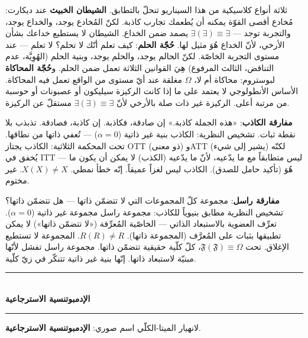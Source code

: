 \documentclass[10pt, openany, oneside]{book}
\renewcommand{\normalsize}{\fontsize{10}{13}\selectfont}
\begin{document}
ثلاثة أنواع كلاسيكية من هذا السيناريو تنحلّ بالتطابق. \textbf{الشيطان الخبيث} عند ديكارت: مُخادع أقصى القوّة يمكنه أن يُطعمك تجارب كاذبة. لكنّ المُخادع يوجد، والخداع يوجد، والتجربة توجد --- $\exists(\exists) \equiv \exists$ يصمد ضمن الخداع. الشيطان لا يستطيع خداعك بشأن الأرخي، لأنّ الخداع هُوَ مثيل لها. \textbf{حُجّة الحلم}: كيف تعلم أنّك لا تحلم؟ لا تعلم --- عند مستوى التجربة الخاصّة. لكنّ الحالم يوجد، والحلم يوجد، وبنية الحلم (الهُوِيَّة، عدم التناقض، الثالث المرفوع) هِيَ القوانين الثلاثة تعمل ضمن الحلم. و\textbf{حُجّة المحاكاة} لبوستروم: محاكاة أم لا، $\Omega$ مغلقة عند أيّ مستوى من الواقع تعمل فيه المحاكاة. الأساس الأنطولوجي لا يعتمد على ما إذا كانت الركيزة سيليكون أو عصبونات أو حوسبة من مرتبة أعلى. الركيزة غير ذات صلة بالأرخي لأنّ $\exists(\exists) \equiv \exists$ مستقلّ عن الركيزة.

\textbf{مفارقة الكاذب}: «هذه الجملة كاذبة.» إن صادقة، فكاذبة. إن كاذبة، فصادقة. تذبذب بلا نقطة ثبات. تشخيص النظرية: الكاذب بنية غير ذاتية ($\alpha = 0$) --- تُعفي ذاتها من نطاقها. تحت المحكمة الثلاثية: الكاذب يجتاز OTT (ذو معنى) وATT (يشير إلى شيء) لكنّه يُخفق في ITT --- ليس متطابقاً مع ما يدّعيه، لأنّ ما يدّعيه (الكذب) لا يمكن أن يكون ما هُوَ (تأكيد حامل للصدق). الكاذب ليس لغزاً عميقاً. إنّه خطأ نمطي. $X(X) \neq X$. غير مختوم.

\textbf{مفارقة راسل}: مجموعة كلّ المجموعات التي لا تتضمّن ذاتها --- هل تتضمّن ذاتها؟ تشخيص النظرية مطابق بنيوياً للكاذب: مجموعة راسل مجموعة غير ذاتية ($\alpha = 0$). تعرِّف العضوية بالاستبعاد الذاتي --- الخاصّية المُعرِّفة («لا تتضمّن ذاتها») لا يمكن تطبيقها بثبات على المُعرَّف (المجموعة ذاتها). $R(R) \neq R$. المجموعة لا تستطيع الإغلاق. تحت $\mathfrak{F}(\mathfrak{F}) \equiv \Omega$، كلّ كلّية حقيقية تتضمّن ذاتها. مجموعة راسل تفشل لأنّها مبنيّة لاستبعاد ذاتها. إنّها بنية غير ذاتية تتنكّر في زيّ كلّية.

\vspace{1.5em}


\begin{center}
    \rule{0.3\textwidth}{0.4pt}\\[0.5em]
    {\normalsize\bfseries الإدمبوتنسية الاسترجاعية}\\[0.3em]
    \rule{0.3\textwidth}{0.4pt}
\end{center}

\vspace{1em}

\noindent لانهيار الميتا-الكلّي اسم صوري: \textbf{الإدمبوتنسية الاسترجاعية}.
\end{document}
